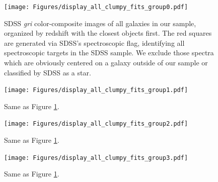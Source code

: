 \begin{figure}
\texttt{[image: Figures/display\_all\_clumpy\_fits\_group0.pdf]}
\caption[Visual catalog of SDSS Stripe 82 ``clumpy'' galaxies.]{SDSS \textit{gri} color-composite images of all galaxies in our sample, organized by redshift with the closest objects first. The red squares are generated via SDSS's spectroscopic flag, identifying all spectroscopic targets in the SDSS sample. We exclude those spectra which are obviously centered on a galaxy outside of our sample or classified by SDSS as a star.}
\label{fig: clumpy catalog}
\end{figure}


\begin{figure}
\texttt{[image: Figures/display\_all\_clumpy\_fits\_group1.pdf]}
\caption[Visual catalog of SDSS Stripe 82 ``clumpy'' galaxies.]{Same as Figure \ref{fig: clumpy catalog}.}
\end{figure}


\begin{figure}
\texttt{[image: Figures/display\_all\_clumpy\_fits\_group2.pdf]}
\caption[Visual catalog of SDSS Stripe 82 ``clumpy'' galaxies.]{Same as Figure \ref{fig: clumpy catalog}.}
\end{figure}

\begin{figure}
\texttt{[image: Figures/display\_all\_clumpy\_fits\_group3.pdf]}
\caption[Visual catalog of SDSS Stripe 82 ``clumpy'' galaxies.]{Same as Figure \ref{fig: clumpy catalog}.}
\end{figure}